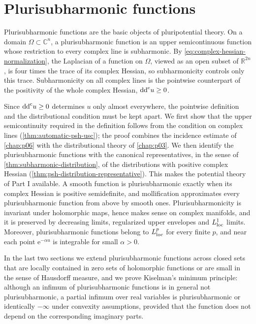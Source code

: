 \chapter{Plurisubharmonic functions}
\label{chap:q02}

Plurisubharmonic functions are the basic objects of pluripotential theory. On a domain $\Omega\subset\mathbb{C}^n$, a plurisubharmonic function is an upper semicontinuous function whose restriction to every complex line is subharmonic. By \eqref{eq:complex-hessian-normalization}, the Laplacian of a function on $\Omega$, viewed as an open subset of $\mathbb R^{2n}$, is four times the trace of its complex Hessian, so subharmonicity controls only this trace. Subharmonicity on all complex lines is the pointwise counterpart of the positivity of the whole complex Hessian, $\mathrm{dd}^{\mathrm{c}} u\geq0$.

Since $\mathrm{dd}^{\mathrm{c}} u\geq0$ determines $u$ only almost everywhere, the pointwise definition and the distributional condition must be kept apart. We first show that the upper semicontinuity required in the definition follows from the condition on complex lines (\cref{thm:automatic-psh-usc}); the proof combines the incidence estimate of \cref{chap:p06} with the distributional theory of \cref{chap:p03}. We then identify the plurisubharmonic functions with the canonical representatives, in the sense of \cref{thm:subharmonic-distribution}, of the distributions with positive complex Hessian (\cref{thm:psh-distribution-representative}). This makes the potential theory of Part I available. A smooth function is plurisubharmonic exactly when its complex Hessian is positive semidefinite, and mollification approximates every plurisubharmonic function from above by smooth ones. Plurisubharmonicity is invariant under holomorphic maps, hence makes sense on complex manifolds, and it is preserved by decreasing limits, regularized upper envelopes and $L^1_{\mathrm{loc}}$ limits. Moreover, plurisubharmonic functions belong to $L^p_{\mathrm{loc}}$ for every finite $p$, and near each point $\mathrm e^{-\alpha u}$ is integrable for small $\alpha>0$.

In the last two sections we extend plurisubharmonic functions across closed sets that are locally contained in zero sets of holomorphic functions or are small in the sense of Hausdorff measure, and we prove Kiselman's minimum principle: although an infimum of plurisubharmonic functions is in general not plurisubharmonic, a partial infimum over real variables is plurisubharmonic or identically $-\infty$ under convexity assumptions, provided that the function does not depend on the corresponding imaginary parts.

